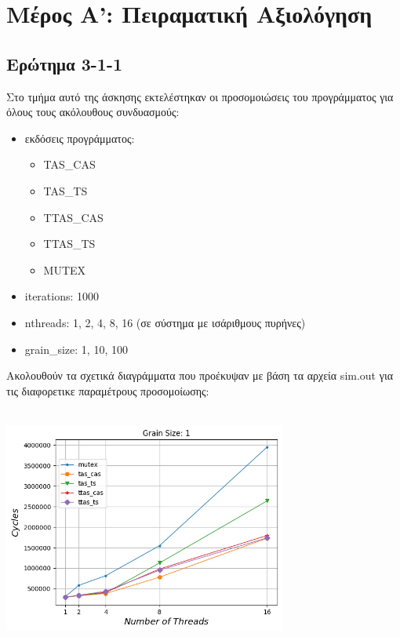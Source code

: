 \section{Μέρος Α': Πειραματική Αξιολόγηση}
\subsection{Ερώτημα 3-1-1}

Στο τμήμα αυτό της άσκησης εκτελέστηκαν οι προσομοιώσεις του προγράμματος για όλους τους
ακόλουθους συνδυασμούς:
\begin{itemize}
   \item 
      εκδόσεις προγράμματος: 
      \begin{itemize}
         \item TAS\_CAS
         \item TAS\_TS
         \item TTAS\_CAS
         \item TTAS\_TS
         \item MUTEX
      \end{itemize}
   \item
      iterations: 1000
   \item 
      nthreads: 1, 2, 4, 8, 16 (σε σύστημα με ισάριθμους πυρήνες)
   \item
      grain\_size: 1, 10, 100
\end{itemize}
Ακολουθούν τα σχετικά διαγράμματα που προέκυψαν με βάση τα αρχεία sim.out για τις διαφορετικε παραμέτρους προσομοίωσης:


\begin{minipage}{\textwidth}
   \begin{center}
      \\
      \vspace{3mm}
      \includegraphics[width=0.7\textwidth, frame]{./graphs/sniper/cycles/grain-1.png}
      \vspace{6mm}
   \end{center}
\end{minipage}

